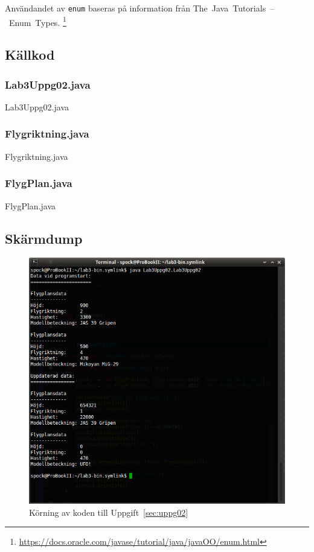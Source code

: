 Användandet av \texttt{enum} baseras på information från
\mbox{The Java Tutorials -- Enum Types}.
\footnote{\url{https://docs.oracle.com/javase/tutorial/java/javaOO/enum.html}}


\subsection{Källkod}
\subsubsection{Lab3Uppg02.java}
\caption{Lab3Uppg02.java}
\label{src:uppg02}

\subsubsection{Flygriktning.java}
\caption{Flygriktning.java}
\label{src:flygriktning}

\subsubsection{FlygPlan.java}
\caption{FlygPlan.java}
\label{src:flygplan}


\subsection{Skärmdump}
\begin{figure}[htbp]
    \centering
        \includegraphics[width=\linewidth]{img/02.png}
    \caption{Körning av koden till Uppgift~\ref{sec:uppg02}}
    \label{fig:uppg02-screenshot}
\end{figure}

